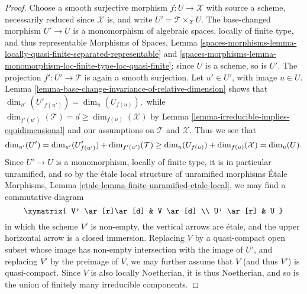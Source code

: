 \begin{proof}
Choose a smooth surjective morphism $f:U \to \mathcal{X}$ with source a scheme,
necessarily reduced since $\mathcal{X}$ is,
and write $U' = \mathcal{T}\times_{\mathcal{X}} U$.  The base-changed morphism
$U' \to U$ is a monomorphism of algebraic spaces, locally of finite
type, and thus representable
Morphisms of Spaces, Lemma
\ref{spaces-morphisms-lemma-locally-quasi-finite-separated-representable} and
\ref{spaces-morphisms-lemma-monomorphism-loc-finite-type-loc-quasi-finite};
since $U$ is a scheme, so is $U'$.
The projection $f': U' \to \mathcal{T}$ is again a smooth surjection.
Let $u' \in U'$, with image $u \in U$.
Lemma \ref{lemma-base-change-invariance-of-relative-dimension}
shows that $\dim_{u'}(U'_{f(u')}) = \dim_u(U_{f(u)}),$
while $\dim_{f'(u')}(\mathcal{T}) =d
\geq \dim_{f(u)}(\mathcal{X})$ by
Lemma \ref{lemma-irreducible-implies-equidimensional}
and our assumptions on $\mathcal{T}$ and $\mathcal{X}$.
Thus we see that
\begin{equation}
\label{equation-dim-inequality}
\dim_{u'} (U') = \dim_{u'} (U'_{f(u')}) + \dim_{f'(u')}(\mathcal{T})
\\
\geq \dim_u (U_{f(u)}) + \dim_{f(u)}(\mathcal{X}) = \dim_u (U).
\end{equation}
Since $U' \to U$ is a monomorphism, locally of finite type,
it is in particular unramified,
and so by the \'etale local structure of unramified morphisms
\'Etale Morphisms, Lemma \ref{etale-lemma-finite-unramified-etale-local},
we may find a commutative diagram
$$
\xymatrix{
V' \ar[r]\ar[d] & V \ar[d] \\
U' \ar[r] & U
}
$$
in which the scheme $V'$ is non-empty,
the vertical arrows are \'etale,
and the upper horizontal arrow is a closed immersion.
Replacing $V$ by a quasi-compact open subset
whose image has non-empty intersection with the image of $U'$,
and replacing $V'$ by the preimage of $V$, we may further
assume that $V$ (and thus $V'$) is quasi-compact.
Since $V$ is also locally Noetherian,
it is thus Noetherian, and so is the union of finitely many irreducible
components.


\end{proof}
